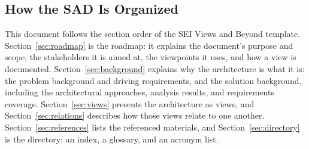 \subsection{How the SAD Is Organized}
\label{sec:organization}

This document follows the section order of the SEI Views and Beyond template.
Section~\ref{sec:roadmap} is the roadmap: it explains the document's purpose and
scope, the stakeholders it is aimed at, the viewpoints it uses, and how a view is
documented. Section~\ref{sec:background} explains why the architecture is what it
is: the problem background and driving requirements, and the solution background,
including the architectural approaches, analysis results, and requirements coverage.
Section~\ref{sec:views} presents the architecture as views, and
Section~\ref{sec:relations} describes how those views relate to one another.
Section~\ref{sec:references} lists the referenced materials, and
Section~\ref{sec:directory} is the directory: an index, a glossary, and an acronym
list.
